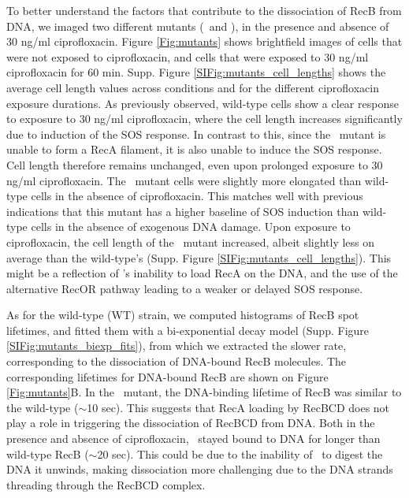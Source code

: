 To better understand the factors that contribute to the dissociation of RecB from DNA, we imaged two different mutants (\dreca\ and \teneighty), in the presence and absence of 30 ng/ml ciprofloxacin. Figure \ref{Fig:mutants} shows brightfield images of cells that were not exposed to ciprofloxacin, and cells that were exposed to 30 ng/ml ciprofloxacin for 60 min. Supp. Figure \ref{SIFig:mutants_cell_lengths} shows the average cell length values across conditions and for the different ciprofloxacin exposure durations. As previously observed, wild-type cells show a clear response to exposure to 30 ng/ml ciprofloxacin, where the cell length increases significantly due to induction of the SOS response. In contrast to this, since the \dreca\ mutant is unable to form a RecA filament, it is also unable to induce the SOS response. Cell length therefore remains unchanged, even upon prolonged exposure to 30 ng/ml ciprofloxacin. The \teneighty\ mutant cells were slightly more elongated than wild-type cells in the absence of ciprofloxacin. This matches well with previous indications that this mutant has a higher baseline of SOS induction than wild-type cells in the absence of exogenous DNA damage.\cite{Lepore2023} Upon exposure to ciprofloxacin, the cell length of the \teneighty\ mutant increased, albeit slightly less on average than the wild-type's (Supp. Figure \ref{SIFig:mutants_cell_lengths}). This might be a reflection of \teneighty's inability to load RecA on the DNA, and the use of the alternative RecOR pathway leading to a weaker or delayed SOS response.

As for the wild-type (WT) strain, we computed histograms of RecB spot lifetimes, and fitted them with a bi-exponential decay model (Supp. Figure \ref{SIFig:mutants_biexp_fits}), from which we extracted the slower rate, corresponding to the dissociation of DNA-bound RecB molecules. The corresponding lifetimes for DNA-bound RecB are shown on Figure \ref{Fig:mutants}B. In the \dreca\ mutant, the DNA-binding lifetime of RecB was similar to the wild-type ($\sim$10 sec). This suggests that RecA loading by RecBCD does not play a role in triggering the dissociation of RecBCD from DNA. Both in the presence and absence of ciprofloxacin, \teneighty\ stayed bound to DNA for longer than wild-type RecB ($\sim$20 sec). This could be due to the inability of \teneighty\ to digest the DNA it unwinds, making dissociation more challenging due to the DNA strands threading through the RecBCD complex.

